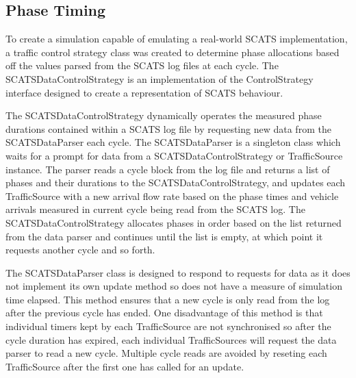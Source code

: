 \subsection{Phase Timing}


To create a simulation capable of emulating a real-world SCATS implementation, a traffic control strategy class was created to determine phase allocations based off the values parsed from the SCATS log files at each cycle. The SCATSDataControlStrategy is an implementation of the ControlStrategy interface designed to create a representation of SCATS behaviour.

The SCATSDataControlStrategy dynamically operates the measured phase durations contained within a SCATS log file by requesting new data from the SCATSDataParser each cycle. The SCATSDataParser is a singleton class which waits for a prompt for data from a SCATSDataControlStrategy or TrafficSource instance. The parser reads a cycle block from the log file and returns a list of phases and their durations to the SCATSDataControlStrategy, and updates each TrafficSource with a new arrival flow rate based on the phase times and vehicle arrivals measured in current cycle being read from the SCATS log. The SCATSDataControlStrategy allocates phases in order based on the list returned from the data parser and continues until the list is empty, at which point it requests another cycle and so forth.

The SCATSDataParser class is designed to respond to requests for data as it does not implement its own update method so does not have a measure of simulation time elapsed. This method ensures that a new cycle is only read from the log after the previous cycle has ended. One disadvantage of this method is that individual timers kept by each TrafficSource are not synchronised so after the cycle duration has expired, each individual TrafficSources will request the data parser to read a new cycle. Multiple cycle reads are avoided by reseting each TrafficSource after the first one has called for an update.























